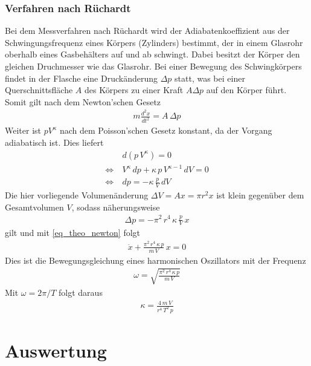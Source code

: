 \documentclass[12pt,a4paper,german]{scrartcl}
\numberwithin{equation}{section}
\begin{document}
  \subsubsection{Verfahren nach Rüchardt}
  Bei dem Messverfahren nach Rüchardt wird der Adiabatenkoeffizient aus der Schwingungsfrequenz eines Körpers (Zylinders) bestimmt, der in einem Glasrohr oberhalb eines Gasbehälters auf und ab schwingt.
  Dabei besitzt der Körper den gleichen Druchmesser wie das Glasrohr.
  Bei einer Bewegung des Schwingkörpers findet in der Flasche eine Druckänderung $\Delta p$ statt, was bei einer Querschnittsfläche $A$ des Körpers zu einer Kraft $A \Delta p$ auf den Körper führt.
  Somit gilt nach dem Newton'schen Gesetz
  \begin{align}
    m \frac{d^2x}{d t^2} = A \, \Delta p
    \label{eq_theo_newton}
  \end{align}
  Weiter ist $p V^\kappa$ nach dem Poisson'schen Gesetz konstant, da der Vorgang adiabatisch ist.
  Dies liefert
  \begin{align}
    &d (p \, V^\kappa) = 0 \nonumber \\
    \Leftrightarrow \ & V^\kappa \, dp + \kappa \, p \, V^{\kappa - 1} \, dV = 0 \nonumber \\
    \Leftrightarrow \ & dp = -\kappa \, \frac{p}{V} \, dV
  \end{align}
  Die hier vorliegende Volumenänderung $\Delta V = A x = \pi r^2 x$ ist klein gegenüber dem Gesamtvolumen $V$, sodass näherungsweise
  \begin{align}
    \Delta p = -\pi^2 \, r^4 \, \kappa \, \frac{p}{V} \, x
  \end{align}
  gilt und mit \ref{eq_theo_newton} folgt
  \begin{align}
    \ddot{x} + \frac{\pi^2 \, r^4 \, \kappa \, p}{m \, V} \, x = 0
  \end{align}
  Dies ist die Bewegungsgleichung eines harmonischen Oszillators mit der Frequenz
  \begin{align}
    \omega = \sqrt{\frac{\pi^2 \, r^4 \, \kappa \, p}{m \, V}}
  \end{align}
  Mit $\omega = 2 \pi / T$ folgt daraus
  \begin{align}
    \kappa = \frac{4 \, m \, V}{r^4 \, T^2 \, p}
    \label{eq_theo_kappa_ruechardt}
  \end{align}
  
  \newpage
  \section{Auswertung}
\end{document}

